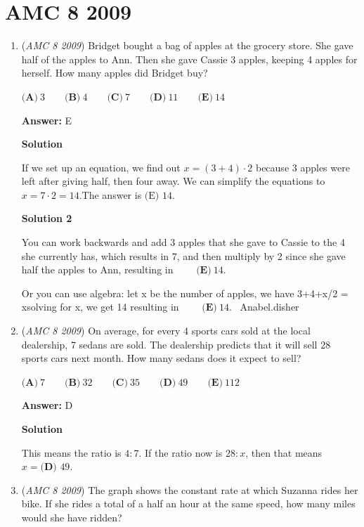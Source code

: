 \section{AMC 8 2009}
        \begin{enumerate}
        	\item (\textit{AMC 8 2009}) Bridget bought a bag of apples at the grocery store. She gave half of the apples to Ann. Then she gave Cassie 3 apples, keeping 4 apples for herself. How many apples did Bridget buy? 


 $\textbf{(A)}\ 3\qquad\textbf{(B)}\ 4\qquad\textbf{(C)}\ 7\qquad\textbf{(D)}\ 11\qquad\textbf{(E)}\ 14$

 \textbf{Answer: }E



\textbf{Solution}

If we set up an equation, we find out $x=(3+4)\cdot 2$ because 3 apples were left after giving half, then four away. We can simplify the equations to $x=7\cdot 2=14.$The answer is $\text{(E) } 14.$




\textbf{Solution 2}

You can work backwards and add 3 apples that she gave to Cassie to the 4 she currently has, which results in 7, and then multiply by 2 since she gave half the apples to Ann, resulting in $\qquad\textbf{(E)}\ 14$. 

 
Or you can use algebra: let x be the number of apples, we have 3+4+x/2 = xsolving for x, we get 14 resulting in $\qquad\textbf{(E)}\ 14$. ~Anabel.disher

 


	\item (\textit{AMC 8 2009}) On average, for every 4 sports cars sold at the local dealership, 7 sedans are sold. The dealership predicts that it will sell 28 sports cars next month. How many sedans does it expect to sell? 


 $\textbf{(A)}\ 7\qquad\textbf{(B)}\ 32\qquad\textbf{(C)}\ 35\qquad\textbf{(D)}\ 49\qquad\textbf{(E)}\ 112$

 \textbf{Answer: }D



\textbf{Solution}

This means the ratio is $4:7$. If the ratio now is $28:x$, then that means $x= \boxed{\textbf{(D) }49}$.

 


	\item (\textit{AMC 8 2009}) The graph shows the constant rate at which Suzanna rides her bike. If she rides a total of a half an hour at the same speed, how many miles would she have ridden?



\end{enumerate}
